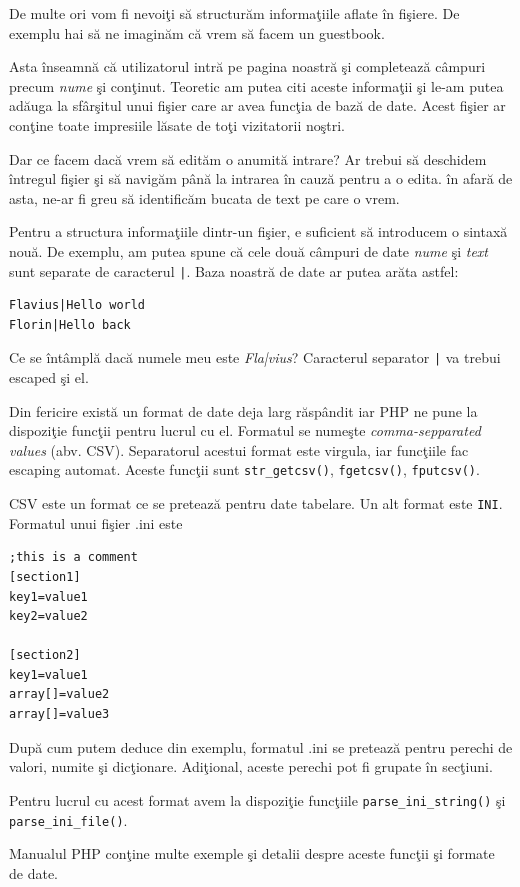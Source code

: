 De multe ori vom fi nevoiţi să structurăm informaţiile aflate \^in
fişiere. De exemplu hai să ne imaginăm că vrem să facem un guestbook.

Asta \^inseamnă că utilizatorul intră pe pagina noastră şi completează
c\^ampuri precum \textit{nume} şi conţinut. Teoretic am putea citi
aceste informaţii şi le-am putea adăuga la sf\^arşitul unui fişier
care ar avea funcţia de {\glqq}bază de date{\grqq}. Acest
fişier ar conţine toate impresiile lăsate de toţi vizitatorii noştri.

Dar ce facem dacă vrem să edităm o anumită intrare? Ar trebui să
deschidem \^intregul fişier şi să navigăm p\^ană la intrarea \^in cauză
pentru a o edita. \^in afară de asta, ne-ar fi greu să identificăm
bucata de text pe care o vrem.

Pentru a structura informaţiile dintr-un fişier, e suficient să
introducem o sintaxă nouă. De exemplu, am putea spune că
cele două c\^ampuri de date \textit{nume} şi \textit{text} sunt separate
de caracterul \texttt{|}. {\glqq}Baza noastră de date{\grqq} ar
putea arăta astfel:
\begin{verbatim}
Flavius|Hello world
Florin|Hello back
\end{verbatim}
Ce se \^int\^amplă dacă numele meu este \textsl{Fla|vius}? Caracterul separator
\texttt{|} va trebui escaped şi el.

Din fericire există un format de date deja larg răsp\^andit iar PHP ne
pune la dispoziţie funcţii pentru lucrul cu el. Formatul se numeşte
\textsl{comma-sepparated values} (abv. CSV).
Separatorul acestui format este virgula, iar funcţiile fac escaping automat. Aceste funcţii sunt
\texttt{str\_getcsv()}, \texttt{fgetcsv()}, \texttt{fputcsv()}.

CSV este un format ce se pretează pentru date tabelare. Un alt format este \texttt{INI}. Formatul
unui fişier .ini este
\begin{verbatim}
;this is a comment
[section1]
key1=value1
key2=value2

[section2]
key1=value1
array[]=value2
array[]=value3
\end{verbatim}

După cum putem deduce din exemplu, formatul .ini se pretează pentru perechi de valori,
numite şi dicţionare. Adiţional, aceste perechi pot fi grupate \^in secţiuni.

Pentru lucrul cu acest format avem la dispoziţie funcţiile
\texttt{parse\_ini\_string()} şi \texttt{parse\_ini\_file()}.

Manualul PHP conţine multe exemple şi detalii despre aceste funcţii
şi formate de date.

